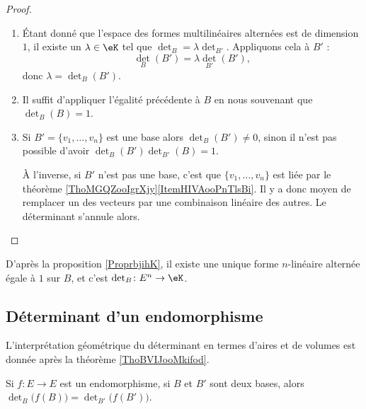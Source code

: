 \begin{proof}
\begin{enumerate}
        \item
            Étant donné que l'espace des formes multilinéaires alternées est de dimension \( 1\), il existe un \( \lambda\in \eK\) tel que \( \det_B=\lambda\det_{B'}\). Appliquons cela à \( B'\) :
            \begin{equation}
                \det_B(B')=\lambda\det_{B'}(B'),
            \end{equation}
            donc \( \lambda=\det_B(B')\).
        \item
            Il suffit d'appliquer l'égalité précédente à \( B\) en nous souvenant que \( \det_B(B)=1\).
        \item
            Si \( B'=\{ v_1,\ldots, v_n \}\) est une base alors \( \det_B(B')\neq 0\), sinon il n'est pas possible d'avoir \( \det_B(B')\det_{B'}(B)=1\).

            À l'inverse, si \( B'\) n'est pas une base, c'est que \( \{ v_1,\ldots, v_n \}\) est liée par le théorème \ref{ThoMGQZooIgrXjy}\ref{ItemHIVAooPnTlsBi}. Il y a donc moyen de remplacer un des vecteurs par une combinaison linéaire des autres. Le déterminant s'annule alors.
    \end{enumerate}
\end{proof}

D'après la proposition \ref{ProprbjihK}, il existe une unique forme \( n\)-linéaire alternée égale à \( 1\) sur \( B\), et c'est \( \det_B\colon E^n\to \eK\).

\subsection{Déterminant d'un endomorphisme}

L'interprétation géométrique du déterminant en termes d'aires et de volumes est donnée après la théorème \ref{ThoBVIJooMkifod}.

\begin{lemma}
    Si \( f\colon E\to E\) est un endomorphisme, si \( B\) et \( B'\) sont deux bases, alors \( \det_B\big( f(B) \big)=\det_{B'}\big( f(B') \big)  \).
\end{lemma}

